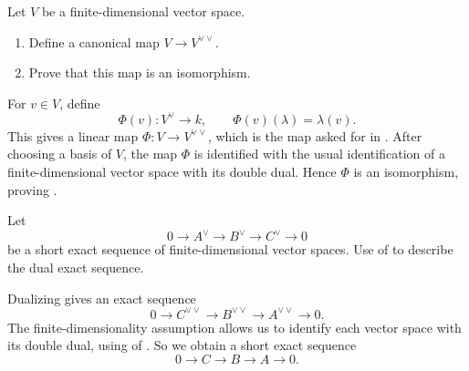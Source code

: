 \documentclass[12pt,a4paper]{article}
\begin{document}
\makesheetheader

\begin{exercise}
  \label{exercise:basic}
  Let \(V\) be a finite-dimensional vector space.
  \begin{enumerate}
    \item Define a canonical map \(V \to V^{\vee\vee}\).
      \label{item:dual-dual-map}
    \item Prove that this map is an isomorphism.
      \label{item:dual-dual-isomorphism}
  \end{enumerate}
\end{exercise}

\showsolutionstrue
\begin{solution}
  For \(v \in V\), define
  \[
    \Phi(v) \colon V^\vee \to k,
    \qquad
    \Phi(v)(\lambda)=\lambda(v).
  \]
  This gives a linear map \(\Phi \colon V \to V^{\vee\vee}\), which is the map
  asked for in . After choosing a basis of \(V\), the
  map \(\Phi\) is identified with the usual identification of a finite-dimensional
  vector space with its double dual. Hence \(\Phi\) is an isomorphism, proving
  .
\end{solution}
\showsolutionsfalse


\begin{exercise}
  \label{exercise:exact-sequence}
  Let
  \[
    0 \to A^{\vee} \to B^{\vee} \to C^{\vee} \to 0
  \]
  be a short exact sequence of finite-dimensional vector spaces. Use
   of  to describe the
  dual exact sequence.
\end{exercise}

\begin{solution}
  Dualizing gives an exact sequence
  \[
    0 \to C^{\vee\vee} \to B^{\vee\vee} \to A^{\vee\vee} \to 0.
  \]
  The finite-dimensionality assumption allows us to identify each vector space
  with its double dual, using  of
  .
  So we obtain a short exact sequence
  \[
    0 \to C \to B \to A \to 0.
  \]
\end{solution}
\end{document}

